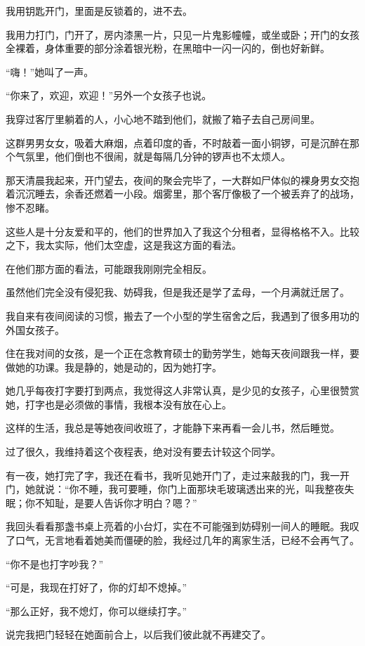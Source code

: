 \par 我用钥匙开门，里面是反锁着的，进不去。
\par 我用力打门，门开了，房内漆黑一片，只见一片鬼影幢幢，或坐或卧；开门的女孩全裸着，身体重要的部分涂着银光粉，在黑暗中一闪一闪的，倒也好新鲜。
\par “嗨！”她叫了一声。
\par “你来了，欢迎，欢迎！”另外一个女孩子也说。
\par 我穿过客厅里躺着的人，小心地不踏到他们，就搬了箱子去自己房间里。
\par 这群男男女女，吸着大麻烟，点着印度的香，不时敲着一面小铜锣，可是沉醉在那个气氛里，他们倒也不很闹，就是每隔几分钟的锣声也不太烦人。
\par 那天清晨我起来，开门望去，夜间的聚会完毕了，一大群如尸体似的裸身男女交抱着沉沉睡去，余香还燃着一小段。烟雾里，那个客厅像极了一个被丢弃了的战场，惨不忍睹。
\par 这些人是十分友爱和平的，他们的世界加入了我这个分租者，显得格格不入。比较之下，我太实际，他们太空虚，这是我这方面的看法。
\par 在他们那方面的看法，可能跟我刚刚完全相反。
\par 虽然他们完全没有侵犯我、妨碍我，但是我还是学了孟母，一个月满就迁居了。
\par 我自来有夜间阅读的习惯，搬去了一个小型的学生宿舍之后，我遇到了很多用功的外国女孩子。
\par 住在我对间的女孩，是一个正在念教育硕士的勤劳学生，她每天夜间跟我一样，要做她的功课。我是静的，她是动的，因为她打字。
\par 她几乎每夜打字要打到两点，我觉得这人非常认真，是少见的女孩子，心里很赞赏她，打字也是必须做的事情，我根本没有放在心上。
\par 这样的生活，我总是等她夜间收班了，才能静下来再看一会儿书，然后睡觉。
\par 过了很久，我维持着这个夜程表，绝对没有要去计较这个同学。
\par 有一夜，她打完了字，我还在看书，我听见她开门了，走过来敲我的门，我一开门，她就说：“你不睡，我可要睡，你门上面那块毛玻璃透出来的光，叫我整夜失眠；你不知耻，是要人告诉你才明白？嗯？”
\par 我回头看看那盏书桌上亮着的小台灯，实在不可能强到妨碍别一间人的睡眠。我叹了口气，无言地看着她美而僵硬的脸，我经过几年的离家生活，已经不会再气了。
\par “你不是也打字吵我？”
\par “可是，我现在打好了，你的灯却不熄掉。”
\par “那么正好，我不熄灯，你可以继续打字。”
\par 说完我把门轻轻在她面前合上，以后我们彼此就不再建交了。
